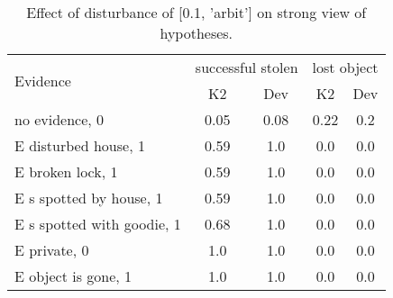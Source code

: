 \begin{table}\begin{tabular}{l|cc|cc}\toprule\multirow{2}{*}{Evidence} & \multicolumn{2}{c}{successful stolen}& \multicolumn{2}{c}{lost object}\\& {K2} & {Dev}& {K2} & {Dev}\\\midrule
no evidence, 0 & 0.05&0.08&0.22&0.2\\E disturbed house, 1 & \cellcolor{Bittersweet}0.59&\cellcolor{Bittersweet}1.0&0.0&0.0\\E broken lock, 1 & \cellcolor{Bittersweet}0.59&\cellcolor{Bittersweet}1.0&0.0&0.0\\E s spotted by house, 1 & \cellcolor{Bittersweet}0.59&\cellcolor{Bittersweet}1.0&0.0&0.0\\E s spotted with goodie, 1 & \cellcolor{Bittersweet}0.68&\cellcolor{Bittersweet}1.0&0.0&0.0\\E private, 0 & 1.0&1.0&0.0&0.0\\E object is gone, 1 & 1.0&1.0&0.0&0.0\\\bottomrule\end{tabular}\caption{Effect of disturbance of [0.1, 'arbit'] on strong view of hypotheses.}\end{table}